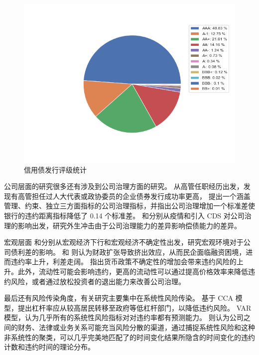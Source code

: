 \begin{figure}
	\centering
	\includegraphics[width=0.9\linewidth]{./data/rating_from_2014.png}
	\caption{\label{fig:rating}信用债发行评级统计}
\end{figure}

公司层面的研究很多还有涉及到公司治理方面的研究。
\Textcite{林晚发2018高管任职经历的得与失}从高管任职经历出发，发现有高管担任过人大代表或政协委员的企业债券发行成功率更高，
\Textcite{anginer2018corporate}提出一个涵盖管理、约束、独立三方面指标的公司治理指标，并指出公司治理增加一个标准差使银行的违约距离指标降低了 0.14 个标准差。
\Textcite{ding2021corporate}和\Textcite{subrahmanyam2017credit}分别从疫情和引入 CDS 对公司治理的影响出发，研究外生冲击由于公司治理能力的差异影响偿债能力的差异。

宏观层面
\Textcite{bai2019common}和\Textcite{bali2021macroeconomic}分别从宏观经济下行和宏观经济不确定性出发，研究宏观环境对于公司债利差的影响。
\Textcite{梅冬州2021财政扩张}和\Textcite{2020Fiscal} 则认为财政扩张导致挤出效应，从而民企面临融资困境，进而违约率上升，利差走阔。
\Textcite{王博2019货币政策不确定性}指出货币政策不确定性的增加会带来违约风险的上升。此外，流动性可能会影响违约\cite{brogaard2017stock}，更高的流动性可以通过提高价格效率来降低违约风险，或者通过放松投资者的退出能力来改善公司治理。

最后还有风险传染角度，有关研究主要集中在系统性风险传染。
\Textcite{苟文均2016债务杠杆与系统性风险传染机制}基于 CCA 模型，提出杠杆率应从较高居民转移至政府等低杠杆部门，以降低违约风险。
\Textcite{2020Do} VAR 模型，认为几乎所有的系统性风险指标对对违约率都有预测能力。
\Textcite{azizpour2018exploring}则认为公司之间的财务、法律或业务关系可能充当风险分散的渠道，通过捕捉系统性风险和这种非系统性的聚类，可以几乎完美地匹配了的时间变化结果所隐含的时间变化的违约计数和违约时间的理论分布。
